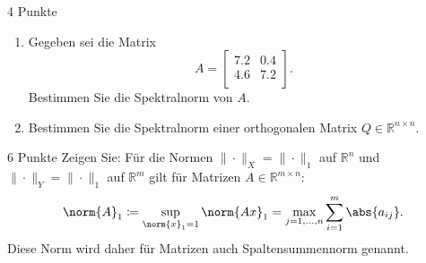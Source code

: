 \documentclass{problemset}
\author{Michael van Straten}
\begin{document}
\maketitle

\setcounter{problem}{3}

\begin{problem}{4 Punkte}
\begin{enumerate}
    \item Gegeben sei die Matrix
          \begin{equation*}
              A =
              \begin{bmatrix}
                  7.2 & 0.4 \\
                  4.6 & 7.2 \\
              \end{bmatrix}.
          \end{equation*}
          Bestimmen Sie die Spektralnorm von \( A \).

    \item Bestimmen Sie die Spektralnorm einer orthogonalen Matrix \(Q \in
          \mathbb{R}^{n \times n}\).
\end{enumerate}
\end{problem}

\begin{problem}{6 Punkte}
Zeigen Sie: Für die Normen \( \| \cdot \|_X = \| \cdot \|_1 \) auf \(
\mathbb{R}^n \) und \( \| \cdot \|_Y = \| \cdot \|_1 \) auf \( \mathbb{R}^m \)
gilt für Matrizen \( A \in \mathbb{R}^{m \times n} \):
\begin{equation*}
    \norm{A}_1 \coloneq \sup_{\norm{x}_1 = 1} \norm{A x}_1
    = \max_{j=1, \ldots, n} \sum_{i=1}^{m} \abs{a_{ij}}.
\end{equation*}
Diese Norm wird daher für Matrizen auch Spaltensummennorm genannt.
\end{problem}
\end{document}
